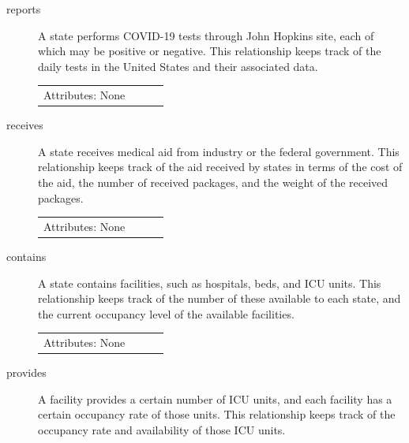 \documentclass[11pt]{article}
\begin{document}
\begin{description}
\item [reports]

\noindent
A state performs COVID-19 tests through John Hopkins site, each of which may be positive or negative. This relationship keeps track of the daily tests in the United States and their associated data.

\begin{tabular}{lllc}  
  Attributes: None \\
\end{tabular}

\item [receives]

\noindent
A state receives medical aid from industry or the federal government. This relationship keeps track of the aid received by states in terms of the cost of the aid, the number of received packages, and the weight of the received packages.

\begin{tabular}{lllc}
     Attributes: None \\
\end{tabular}




\item [contains]

\noindent
A state contains facilities, such as hospitals, beds, and ICU units. This relationship keeps track of the number of these available to each state, and the current occupancy level of the available facilities.

\begin{tabular}{lllc}
    Attributes: None \\
\end{tabular}

\item [provides]

\noindent
A facility provides a certain number of ICU units, and each facility has a certain occupancy rate of those units. This relationship keeps track of the occupancy rate and availability of those ICU units.


\end{description}
\end{document}
